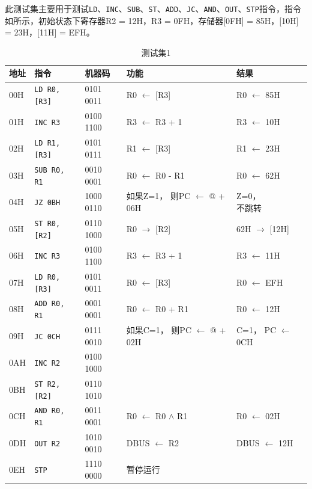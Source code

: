 \documentclass[lang=cn,11pt,a4paper,cite=authornum]{paper}
\begin{document}
此测试集主要用于测试\texttt{LD}、\texttt{INC}、\texttt{SUB}、\texttt{ST}、\texttt{ADD}、\texttt{JC}、\texttt{AND}、\texttt{OUT}、\texttt{STP}指令，指令如所示，初始状态下寄存器R2 = 12H，R3 = 0FH，存储器[0FH] = 85H，[10H] = 23H，[11H] = EFH。

\begin{table}[!htbp]
    \centering
    \caption{测试集1\label{tab:base_test_1}}
    \begin{tabular}{|l|l|l|l|l|}
        \hline 
        地址 & 指令 & 机器码 & 功能 & 结果 \\ \hline 
        00H & \texttt{LD R0, [R3]} & 0101 0011 & R0 $\leftarrow$ [R3] & R0 $\leftarrow$ 85H \\ \hline 
        01H & \texttt{INC R3} & 0100 1100 & R3 $\leftarrow$ R3 + 1 & R3 $\leftarrow$ 10H \\ \hline 
        02H & \texttt{LD R1, [R3]} & 0101 0111 & R1 $\leftarrow$ [R3] & R1 $\leftarrow$ 23H \\ \hline 
        03H & \texttt{SUB R0, R1} & 0010 0001 & R0 $\leftarrow$ R0 - R1 & R0 $\leftarrow$ 62H \\ \hline 
        04H & \texttt{JZ 0BH} & 1000 0110 & \makecell[l]{如果Z=1，\\则PC $\leftarrow$ @ + 06H} & \makecell[l]{Z=0，\\不跳转} \\ \hline 
        05H & \texttt{ST R0, [R2]} & 0110 1000 & R0 $\rightarrow$ [R2] & 62H $\rightarrow$ [12H]  \\ \hline 
        06H & \texttt{INC R3} & 0100 1100 & R3 $\leftarrow$ R3 + 1 & R3 $\leftarrow$ 11H \\ \hline 
        07H & \texttt{LD R0, [R3]} & 0101 0011 & R0 $\leftarrow$ [R3]  & R0 $\leftarrow$ EFH \\ \hline 
        08H & \texttt{ADD R0, R1} & 0001 0001 & R0 $\leftarrow$ R0 + R1 & R0 $\leftarrow$ 12H \\ \hline 
        09H & \texttt{JC 0CH} & 0111 0010 & \makecell[l]{如果C=1，\\ 则PC $\leftarrow$ @ + 02H} & \makecell[l]{C=1，\\PC $\leftarrow$ 0CH} \\ \hline 
        0AH & \texttt{INC R2} & 0100 1000 &  &  \\ \hline 
        0BH & \texttt{ST R2, [R2]} & 0110 1010 &  &  \\ \hline 
        0CH & \texttt{AND R0, R1} & 0011 0001 & R0 $\leftarrow$ R0 $\wedge$ R1 & R0 $\leftarrow$ 02H \\ \hline 
        0DH & \texttt{OUT R2} & 1010 0010 & DBUS $\leftarrow$ R2 & DBUS $\leftarrow$ 12H \\ \hline 
        0EH & \texttt{STP} & 1110 0000 & 暂停运行 &  \\ \hline
    \end{tabular}
\end{table}
\end{document}
